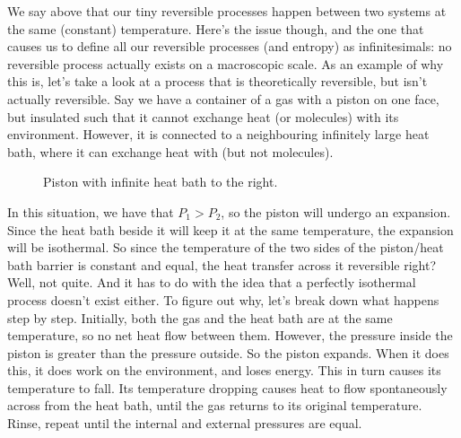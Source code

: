 \newline\newline
We say above that our tiny reversible processes happen between two systems at the same (constant) temperature. Here's the issue though, and the one that causes us to define all our reversible processes (and entropy) as infinitesimals: no reversible process actually exists on a macroscopic scale.
\newline\newline
As an example of why this is, let's take a look at a process that is theoretically reversible, but isn't actually reversible. Say we have a container of a gas with a piston on one face, but insulated such that it cannot exchange heat (or molecules) with its environment. However, it is connected to a neighbouring infinitely large heat bath, where it can exchange heat with (but not molecules). 
\begin{figure}[h!]
\centering
{}
\caption{Piston with infinite heat bath to the right.}
\end{figure}
In this situation, we have that $P_{1}>P_{2}$, so the piston will undergo an expansion. Since the heat bath beside it will keep it at the same temperature, the expansion will be isothermal. So since the temperature of the two sides of the piston/heat bath barrier is constant and equal, the heat transfer across it reversible right? Well, not quite. And it has to do with the idea that a perfectly isothermal process doesn't exist either.
\newline\newline
To figure out why, let's break down what happens step by step. Initially, both the gas and the heat bath are at the same temperature, so no net heat flow between them. However, the pressure inside the piston is greater than the pressure outside. So the piston expands. When it does this, it does work on the environment, and loses energy. This in turn causes its temperature to fall. Its temperature dropping causes heat to flow spontaneously across from the heat bath, until the gas returns to its original temperature. Rinse, repeat until the internal and external pressures are equal.
